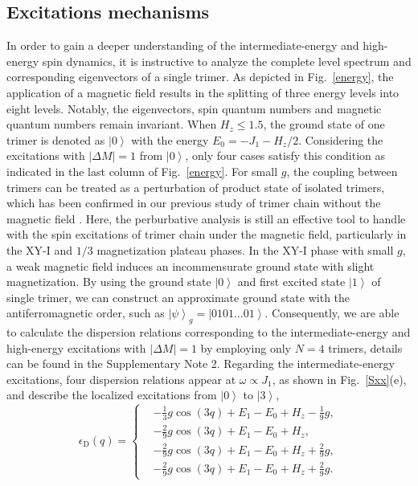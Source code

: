 \documentclass[aps,prx,showpacs,floatfix,twocolumn,superscriptaddress,nofootinbib,longbibliography]{revtex4-2}
\begin{document}
\subsection{Excitations mechanisms}

In order to gain a deeper understanding of  the intermediate-energy and high-energy spin dynamics, it is instructive to analyze the complete level spectrum and corresponding eigenvectors of a single trimer. As depicted in Fig.~\ref{energy}, the application of a magnetic field results in the splitting of three energy levels into eight levels.  Notably,
  the eigenvectors, spin quantum numbers and magnetic quantum numbers   remain invariant.  When $H_z \leq 1.5$, the ground state of one trimer is denoted as $\left|0\right\rangle$ with the energy $E_0 = -J_1-H_z/2$. 
Considering the excitations with $\left|\Delta M\right|=1$ from $\left|0\right\rangle$,  only four cases satisfy this condition as indicated  in the last column of Fig.~\ref{energy}.
For small $g$, the coupling between trimers can be treated as a perturbation of product state of isolated trimers, which has been confirmed in our previous study of trimer chain without the magnetic field \cite{cheng2022}. 
Here, the perburbative analysis is still an effective tool to handle with the spin excitations of trimer chain under the magnetic field, particularly in the XY-I and $1/3 $ magnetization  plateau phases.
In the XY-I phase with small $g$, a weak magnetic field induces an incommensurate ground state with  slight magnetization. By using the  ground state $\left|0\right\rangle$ and first excited state $\left|1\right\rangle$ of single trimer,  we can  construct an  approximate ground state with the antiferromagnetic order, such as $\left|\psi\right\rangle_g = \left|0101\dots01\right\rangle$. Consequently,  we are able to calculate the dispersion relations corresponding to the intermediate-energy and high-energy excitations with $\left|\Delta M \right|= 1$ by employing  only $N=4$ trimers, details can be found in the Supplementary Note 2. 
Regarding the intermediate-energy excitations, 
four  dispersion relations 	 appear  at $\omega \propto J_1$, as shown in Fig.~\ref{Sxx}(e), and describe the localized excitations  from $\left|0\right\rangle$ to $\left|3\right\rangle$,
\begin{equation}
\label{intermediate}
	\epsilon_{\mathrm{D}} (q)= \left\{
    \begin{split}
   &-  \frac{1}{3} g \cos{(3q)}+E_1 -E_0 + H_z - \frac{1}{9}g, 
    \\
    &- \frac{2}{9} g \cos{(3q)}+E_1 -E_0 + H_z, 
    \\
    &- \frac{2}{9} g \cos{(3q)}+E_1 -E_0 + H_z + \frac{2}{9}g, 
    \\
    &- \frac{2}{9} g \cos{(3q)}+E_1-E_0  + H_z + \frac{2}{9}g.
    \end{split}
\right.
\end{equation}
\end{document}
